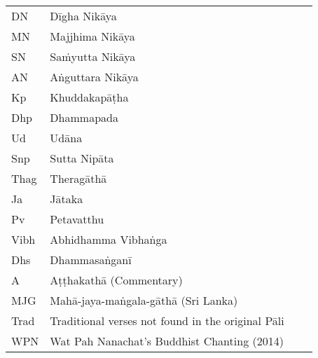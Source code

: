 \vspace{-0.6em}
\begin{tabular}{@{}llll@{}}
  DN    & Dīgha Nikāya                                        \\
  MN    & Majjhima Nikāya                                     \\
  SN    & Saṁyutta Nikāya                                     \\
  AN    & Aṅguttara Nikāya                                    \\
  Kp    & Khuddakapāṭha                                       \\
  Dhp   & Dhammapada                                          \\
  Ud    & Udāna                                               \\
  Snp   & Sutta Nipāta                                        \\
  Thag  & Theragāthā                                          \\
  Ja    & Jātaka                                              \\
  Pv    & Petavatthu                                          \\
  Vibh  & Abhidhamma Vibhaṅga                                 \\
  Dhs   & Dhammasaṅganī                                       \\
  A     & Aṭṭhakathā (Commentary)                             \\
  MJG   & Mahā-jaya-maṅgala-gāthā (Sri Lanka)                 \\
  Trad  & Traditional verses not found in the original Pāli   \\
  WPN   & Wat Pah Nanachat's Buddhist Chanting (2014)           \\
\end{tabular}

\else

